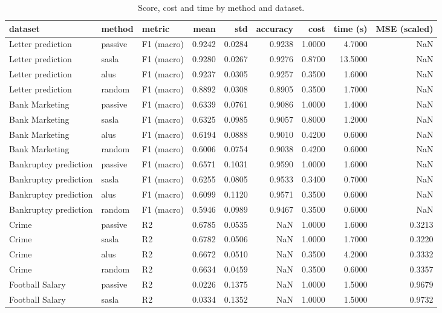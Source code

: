 \begin{table}
\caption{Score, cost and time by method and dataset.}
\label{tab:summary}
\begin{tabular}{lllrrrrrr}
\toprule
dataset & method & metric & mean & std & accuracy & cost & time (s) & MSE (scaled) \\
\midrule
Letter prediction & passive & F1 (macro) & 0.9242 & 0.0284 & 0.9238 & 1.0000 & 4.7000 & NaN \\
Letter prediction & sasla & F1 (macro) & 0.9280 & 0.0267 & 0.9276 & 0.8700 & 13.5000 & NaN \\
Letter prediction & alus & F1 (macro) & 0.9237 & 0.0305 & 0.9257 & 0.3500 & 1.6000 & NaN \\
Letter prediction & random & F1 (macro) & 0.8892 & 0.0308 & 0.8905 & 0.3500 & 1.7000 & NaN \\
Bank Marketing & passive & F1 (macro) & 0.6339 & 0.0761 & 0.9086 & 1.0000 & 1.4000 & NaN \\
Bank Marketing & sasla & F1 (macro) & 0.6325 & 0.0985 & 0.9057 & 0.8000 & 1.2000 & NaN \\
Bank Marketing & alus & F1 (macro) & 0.6194 & 0.0888 & 0.9010 & 0.4200 & 0.6000 & NaN \\
Bank Marketing & random & F1 (macro) & 0.6006 & 0.0754 & 0.9038 & 0.4200 & 0.6000 & NaN \\
Bankruptcy prediction & passive & F1 (macro) & 0.6571 & 0.1031 & 0.9590 & 1.0000 & 1.6000 & NaN \\
Bankruptcy prediction & sasla & F1 (macro) & 0.6255 & 0.0805 & 0.9533 & 0.3400 & 0.7000 & NaN \\
Bankruptcy prediction & alus & F1 (macro) & 0.6099 & 0.1120 & 0.9571 & 0.3500 & 0.6000 & NaN \\
Bankruptcy prediction & random & F1 (macro) & 0.5946 & 0.0989 & 0.9467 & 0.3500 & 0.6000 & NaN \\
Crime & passive & R2 & 0.6785 & 0.0535 & NaN & 1.0000 & 1.6000 & 0.3213 \\
Crime & sasla & R2 & 0.6782 & 0.0506 & NaN & 1.0000 & 1.7000 & 0.3220 \\
Crime & alus & R2 & 0.6672 & 0.0510 & NaN & 0.3500 & 4.2000 & 0.3332 \\
Crime & random & R2 & 0.6634 & 0.0459 & NaN & 0.3500 & 0.6000 & 0.3357 \\
Football Salary & passive & R2 & 0.0226 & 0.1375 & NaN & 1.0000 & 1.5000 & 0.9679 \\
Football Salary & sasla & R2 & 0.0334 & 0.1352 & NaN & 1.0000 & 1.5000 & 0.9732 \\

\end{tabular}
\end{table}
